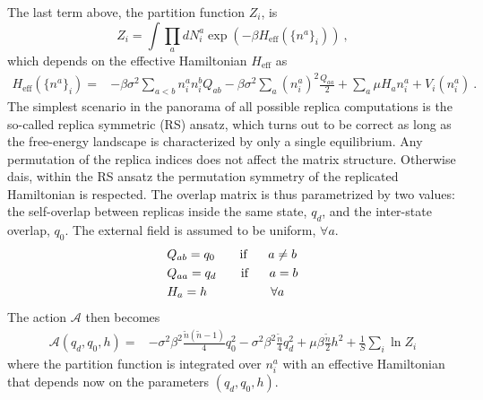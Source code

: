\documentclass[12pt]{article}
\begin{document}
The last term above, the partition function $Z_i$, is
\begin{equation}
Z_i= \int \prod \limits_a d N_i^a \exp \left(-\beta H_\text{eff}(\lbrace n^a \rbrace_i ) \right) \ ,
\end{equation}
which depends on the effective Hamiltonian $H_{\text{eff}}$ as
\begin{equation}
\begin{split}
 H_{\text{eff}}(\lbrace n^a \rbrace_i )=& -\beta  \sigma^2 \sum \limits_{a <b} n_i^a n_i^b Q_{ab}  -\beta  \sigma^2 \sum \limits_a (n_i^a)^2 \frac{Q_{aa}}{2} + \sum \limits_a  \mu H_a n_i^a  + V_i(n_i^a) \ .  
\end{split}
\end{equation}
The simplest scenario in the panorama of all possible replica computations is the so-called replica symmetric (RS) ansatz, which turns out to be correct as long as the free-energy landscape is characterized by only a single equilibrium. 
Any permutation of the replica indices does not affect the matrix structure. Otherwise dais, within the RS ansatz the permutation symmetry of the replicated Hamiltonian is respected.
The overlap matrix is thus parametrized by two values: the self-overlap between replicas inside the same state, $q_d$, and the inter-state overlap, $q_0$. The external field is assumed to be uniform, $\forall a$.
\begin{equation}
\begin{split}
& Q_{ab}= q_0 \hspace{0.7cm }\text{if} \hspace{0.6cm} a \neq b    \\
& Q_{aa}=q_d \hspace{0.7cm }\text{if} \hspace{0.6cm} a = b\\
& H_a=h  \hspace{1.8cm } \forall a
\label{Ansatz_RS}
\end{split}
\end{equation}
The action $\mathcal{A}$ then becomes
\begin{equation}
\begin{split}
    \mathcal{A}(q_d,q_0,h)= & - \sigma^2 \beta^2 \frac{\tilde{n}(\tilde{n}-1)}{4} q_0^2 -\sigma^2 \beta^2 \frac{\tilde{n}}{4} q_d^2  +  \mu \beta \frac{\tilde{n}}{2} h^2 +\frac{1}{S} \sum \limits_{i} \ln Z_i 
    \end{split}
    \label{actionRS}
\end{equation}
where the partition function is integrated over $n_i^a$ with an effective Hamiltonian that depends now on the parameters $(q_d,q_0,h)$. 
\end{document}
